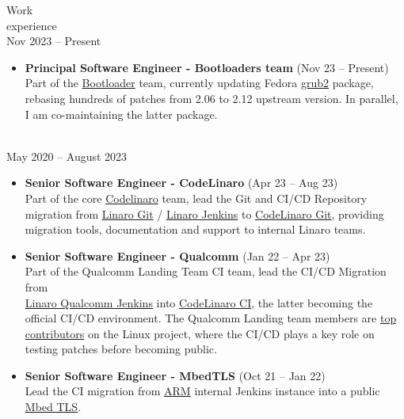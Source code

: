 \documentclass{resume}
\def\linaro{Linaro Limited}
\def\redhat{Red Hat}
\begin{document}
\begin{category}{Work \\experience}
  \citem{\redhat}\\
  Nov 2023 -- Present

  \begin{itemize}
  \item \textbf{Principal Software Engineer - Bootloaders team} (Nov 23 -- Present)\\
    Part of the \href{https://github.com/rhboot}{Bootloader} team, currently updating Fedora
      \href{https://src.fedoraproject.org/rpms/grub2}{grub2} package, rebasing hundreds of patches from 2.06 to 2.12 upstream version.
      In parallel, I am co-maintaining the latter package.
  \end{itemize}

  \citem{\linaro}\\
  May 2020 -- August 2023

  \begin{itemize}
  \item \textbf{Senior Software Engineer - CodeLinaro} (Apr 23 -- Aug 23)\\
    Part of the core \href{www.codelinaro.org}{Codelinaro} team, lead the Git and CI/CD Repository migration
    from \href{https://git.linaro.org}{Linaro Git} / \href{https://ci.linaro.org}{Linaro Jenkins} to
    \href{https://git.codelinaro.org}{CodeLinaro Git}, providing migration tools, documentation and support to
    internal Linaro teams.
  \end{itemize}

  \begin{itemize}
  \item \textbf{Senior Software Engineer - Qualcomm} (Jan 22 -- Apr 23)\\
    Part of the Qualcomm Landing Team CI team, lead the CI/CD Migration from \\
    \href{https://ci.linaro.org/view/qclt/}{Linaro Qualcomm Jenkins} into
    \href{https://git.codelinaro.org/linaro/qcomlt/ci/configs}{CodeLinaro CI}, the latter becoming the official CI/CD environment.
    The Qualcomm Landing team members are \href{https://kernelnewbies.org/DevelopmentStatistics}{top contributors} on the Linux project,
    where the CI/CD plays a key role on testing patches before becoming public.
  \end{itemize}

  \begin{itemize}
  \item \textbf{Senior Software Engineer - MbedTLS} (Oct 21 -- Jan 22)\\
    Lead the CI migration from \href{https://www.arm.com/}{ARM} internal Jenkins instance into a public \href{https://github.com/ARMmbed/mbedtls}{Mbed TLS}.
  \end{itemize}


\end{category}
\end{document}
